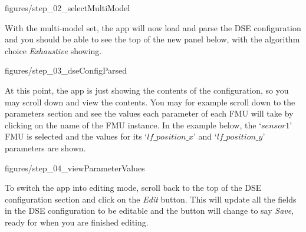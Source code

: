 \documentclass[11pt,a4paper]{../tutorial}
\begin{document}
\begin{instructions}
\begin{center}\begin{annotation}[width=0.7\linewidth,trim=0 0 0 0,clip]{figures/step_02_selectMultiModel}
\end{annotation}\end{center}


\item With the multi-model set, the app will now load and parse the DSE configuration and you should be able to see the top of the new panel below, with the algorithm choice \emph{Exhaustive} showing.

\begin{center}\begin{annotation}[width=0.7\linewidth,trim=0 0 0 0,clip]{figures/step_03_dseConfigParsed}
\end{annotation}\end{center}

\newpage

At this point, the app is just showing the contents of the configuration, so you may scroll down and view the contents. You may for example scroll down to the parameters section and see the values each parameter of each FMU will take by clicking on the name of the FMU instance.  In the example below, the `$sensor1$’ FMU is selected and the values for its `$lf\_position\_x$’ and `$lf\_position\_y$’ parameters are shown.


\begin{center}\begin{annotation}[width=0.7\linewidth,trim=0 0 0 0,clip]{figures/step_04_viewParameterValues}
\end{annotation}\end{center}


To switch the app into editing mode, scroll back to the top of the DSE configuration section and click on the \emph{Edit} button. This will update all the fields in the DSE configuration to be editable and the button will change to say \emph{Save}, ready for when you are finished editing.



\end{instructions}
\end{document}

